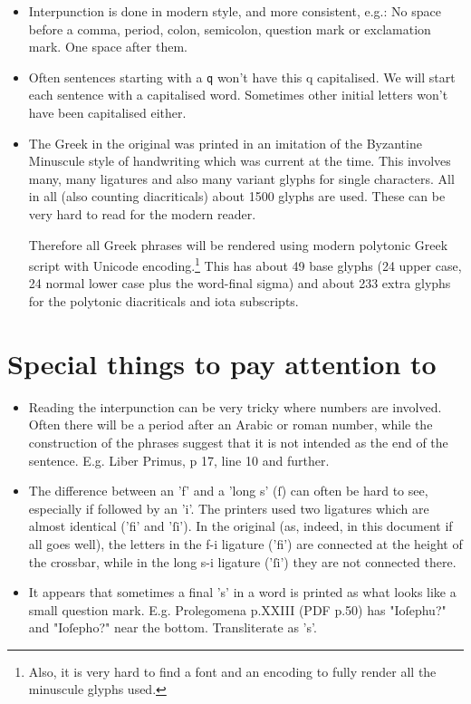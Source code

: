 \documentclass{report}
\begin{document}
\begin{itemize}
\item Interpunction is done in modern style, and more consistent, e.g.:
No space before a comma, period, colon, semicolon,
 question mark or exclamation mark. One space after them.

\item Often sentences starting with a \verb+q+ won't have this q capitalised.
We will start each sentence with a capitalised word. Sometimes other initial
letters won't have been capitalised either.

\item The Greek in the original was printed in an imitation of the
Byzantine Minuscule style of handwriting which was current at the time.
This involves many, many ligatures and also many variant glyphs for single
characters. All in all (also counting diacriticals) about 1500 glyphs are used.
These can be very hard to read for the modern reader.

Therefore all Greek phrases will be rendered using modern polytonic Greek
script with Unicode encoding.\footnote{Also, it is very hard to find a font
and an encoding to fully render all the minuscule glyphs used.}
This has about 49 base glyphs (24 upper case, 24 normal lower case
plus the word-final sigma) and about 233 extra glyphs for
the polytonic diacriticals and iota subscripts.

\end{itemize}

\section{Special things to pay attention to}
\begin{itemize}
\item Reading the interpunction can be very tricky where numbers are involved.
Often there will be a period after an Arabic or roman number, while the
construction of the phrases suggest that it is not intended as the end of 
the sentence. E.g. Liber Primus, p 17, line 10 and further.
\item The difference between an 'f' and a 'long s' (ſ) can often be hard to see,
 especially if followed by an 'i'. The printers used two ligatures which are
 almost identical ('fi' and 'ſi'). In the original (as, indeed, in this
 document if all goes well), the letters in the f-i ligature ('fi') are
 connected at the height of the crossbar, while in the long s-i ligature ('ſi')
 they are not connected there.
\item It appears that sometimes a final 's' in a word is printed as what looks
 like a small question mark. E.g. Prolegomena p.XXIII (PDF p.50) has "Ioſephu?"
 and "Ioſepho?" near the bottom. Transliterate as 's'.
\end{itemize}
\end{document}
